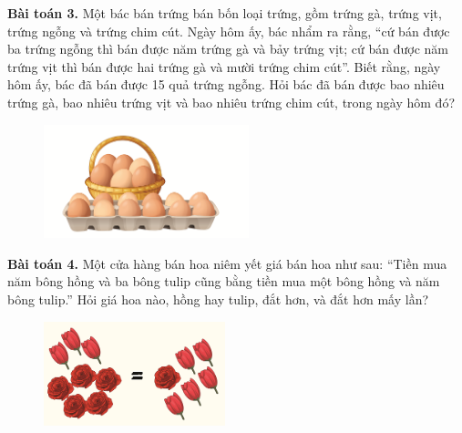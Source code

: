 	\textbf{Bài toán 3.} Một bác bán trứng bán bốn loại trứng, gồm trứng gà, trứng vịt, trứng ngỗng và trứng chim cút. Ngày hôm ấy, bác nhẩm ra rằng, “cứ bán được ba trứng ngỗng thì bán được năm trứng gà và bảy trứng vịt; cứ bán được năm trứng vịt thì bán được hai trứng gà và mười trứng chim cút”. Biết rằng, ngày hôm ấy, bác đã bán được 15 quả trứng ngỗng. Hỏi bác đã bán được bao nhiêu trứng gà, bao nhiêu trứng vịt và bao nhiêu trứng chim cút, trong ngày hôm đó?
	\begin{figure}[H]
		\centering
		\vspace*{-5pt}
		\captionsetup{labelformat= empty, justification=centering}
		\includegraphics[width=0.53\textwidth]{pic6}
		\vspace*{-5pt}
	\end{figure}
	\textbf{Bài toán 4.} Một cửa hàng bán hoa niêm yết giá bán hoa như sau:
	\vskip 0.15cm
	“Tiền mua năm bông hồng và ba bông tulip cũng bằng tiền mua một bông hồng và năm bông tulip.”
	\vskip 0.15cm
	Hỏi giá hoa nào, hồng hay tulip, đắt hơn, và đắt hơn mấy lần?
	\begin{figure}[H]
		\centering
		\vspace*{-5pt}
		\captionsetup{labelformat= empty, justification=centering}
		\includegraphics[width=0.47\textwidth]{pic5}
		\vspace*{-5pt}
	\end{figure}
	\vskip 0.1cm
